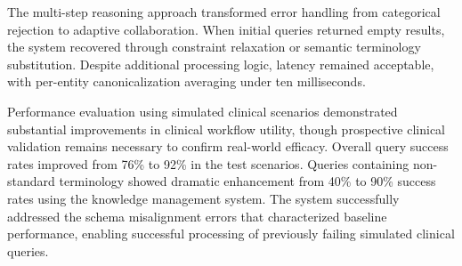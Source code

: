 The multi-step reasoning approach transformed error handling from categorical rejection to adaptive collaboration. When initial queries returned empty results, the system recovered through constraint relaxation or semantic terminology substitution. Despite additional processing logic, latency remained acceptable, with per-entity canonicalization averaging under ten milliseconds.

Performance evaluation using simulated clinical scenarios demonstrated substantial improvements in clinical workflow utility, though prospective clinical validation remains necessary to confirm real-world efficacy. Overall query success rates improved from 76\% to 92\% in the test scenarios. Queries containing non-standard terminology showed dramatic enhancement from 40\% to 90\% success rates using the knowledge management system. The system successfully addressed the schema misalignment errors that characterized baseline performance, enabling successful processing of previously failing simulated clinical queries.

%
%
%
%
%

